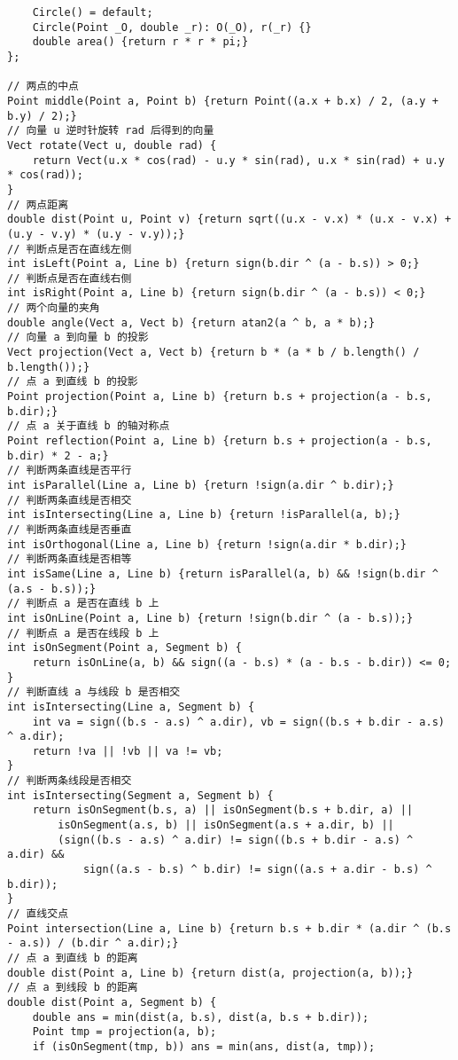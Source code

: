 \begin{verbatim}
    Circle() = default;
    Circle(Point _O, double _r): O(_O), r(_r) {}
    double area() {return r * r * pi;}
};

// 两点的中点
Point middle(Point a, Point b) {return Point((a.x + b.x) / 2, (a.y + b.y) / 2);}
// 向量 u 逆时针旋转 rad 后得到的向量
Vect rotate(Vect u, double rad) {
    return Vect(u.x * cos(rad) - u.y * sin(rad), u.x * sin(rad) + u.y * cos(rad));
}
// 两点距离
double dist(Point u, Point v) {return sqrt((u.x - v.x) * (u.x - v.x) + (u.y - v.y) * (u.y - v.y));}
// 判断点是否在直线左侧
int isLeft(Point a, Line b) {return sign(b.dir ^ (a - b.s)) > 0;}
// 判断点是否在直线右侧
int isRight(Point a, Line b) {return sign(b.dir ^ (a - b.s)) < 0;}
// 两个向量的夹角
double angle(Vect a, Vect b) {return atan2(a ^ b, a * b);}
// 向量 a 到向量 b 的投影
Vect projection(Vect a, Vect b) {return b * (a * b / b.length() / b.length());}
// 点 a 到直线 b 的投影
Point projection(Point a, Line b) {return b.s + projection(a - b.s, b.dir);}
// 点 a 关于直线 b 的轴对称点
Point reflection(Point a, Line b) {return b.s + projection(a - b.s, b.dir) * 2 - a;}
// 判断两条直线是否平行
int isParallel(Line a, Line b) {return !sign(a.dir ^ b.dir);}
// 判断两条直线是否相交
int isIntersecting(Line a, Line b) {return !isParallel(a, b);}
// 判断两条直线是否垂直
int isOrthogonal(Line a, Line b) {return !sign(a.dir * b.dir);}
// 判断两条直线是否相等
int isSame(Line a, Line b) {return isParallel(a, b) && !sign(b.dir ^ (a.s - b.s));}
// 判断点 a 是否在直线 b 上
int isOnLine(Point a, Line b) {return !sign(b.dir ^ (a - b.s));}
// 判断点 a 是否在线段 b 上
int isOnSegment(Point a, Segment b) {
    return isOnLine(a, b) && sign((a - b.s) * (a - b.s - b.dir)) <= 0;
}
// 判断直线 a 与线段 b 是否相交
int isIntersecting(Line a, Segment b) {
    int va = sign((b.s - a.s) ^ a.dir), vb = sign((b.s + b.dir - a.s) ^ a.dir);
    return !va || !vb || va != vb;
}
// 判断两条线段是否相交
int isIntersecting(Segment a, Segment b) {
    return isOnSegment(b.s, a) || isOnSegment(b.s + b.dir, a) ||
        isOnSegment(a.s, b) || isOnSegment(a.s + a.dir, b) ||
        (sign((b.s - a.s) ^ a.dir) != sign((b.s + b.dir - a.s) ^ a.dir) &&
            sign((a.s - b.s) ^ b.dir) != sign((a.s + a.dir - b.s) ^ b.dir));
}
// 直线交点
Point intersection(Line a, Line b) {return b.s + b.dir * (a.dir ^ (b.s - a.s)) / (b.dir ^ a.dir);}
// 点 a 到直线 b 的距离
double dist(Point a, Line b) {return dist(a, projection(a, b));}
// 点 a 到线段 b 的距离
double dist(Point a, Segment b) {
    double ans = min(dist(a, b.s), dist(a, b.s + b.dir));
    Point tmp = projection(a, b);
    if (isOnSegment(tmp, b)) ans = min(ans, dist(a, tmp));

\end{verbatim}
